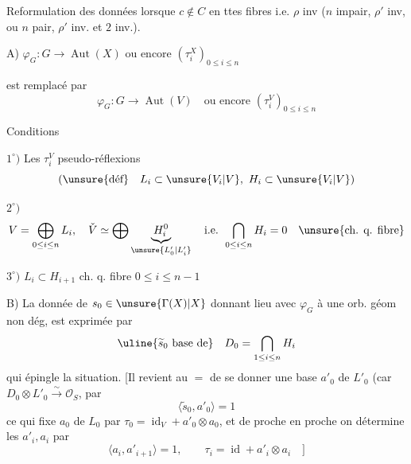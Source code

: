Reformulation des données lorsque $c\notin C$ en ttes fibres
i.e. $\rho$ inv ($n$ impair, $\rho'$ inv, ou $n$ pair, $\rho'$ inv. et $2$ inv.).

A) $\varphi_G:G\longrightarrow\operatorname{Aut}(X)$
ou encore $(\tau_i^X)_{0\leq i\leq n}$

est remplacé par
\[
\varphi_G:G\longrightarrow\operatorname{Aut}(V)
\quad\text{ou encore }(\tau_i^V)_{0\leq i\leq n}
\]

Conditions

$1^\circ)$ Les $\tau_i^V$ pseudo-réflexions
\[
(\text{\unsure{déf}} \quad L_i\subset\unsure{V_i|V},\ H_i\subset\unsure{V_i|V})
\]


$2^\circ)$
\[
V=\bigoplus_{0\leq i\leq n}L_i,\quad
\check V\simeq\bigoplus\underbrace{H_i^0}_{\unsure{L'_0|L'_i}}
\quad\text{i.e. }\bigcap_{0\leq i\leq n}H_i=0
\quad\text{\unsure{ch. q. fibre}}
\]

$3^\circ)$ $L_i\subset H_{i+1}$ ch. q. fibre
\hfill$0\leq i\leq n-1$


B) La donnée de $s_0\in\unsure{\Gamma(X)|X}$
\deleted{$\mathbin{-}$}
donnant lieu avec $\varphi_G$ à une orb. géom non dég,
est  exprimée par
\[
\uline{\widetilde s_0\text{ base de}}\quad
D_0=\bigcap_{1\leq i\leq n}H_i
\]
qui épingle la situation.
[Il revient au $=$ de se donner une base
$a'_0$ de $L'_0$ (car $D_0\otimes L'_0\xrightarrow{\sim}\mathcal O_S$, par
\[
\boxed{\langle\widetilde s_0,a'_0\rangle=1}
\]
ce qui fixe  $a_0$ de $L_0$ par
$\tau_0=\operatorname{id}_V+a'_0\otimes a_0$,
et de proche en proche on détermine les $a'_i,a_i$ par
\[
\langle a_i,a'_{i+1}\rangle=1,\qquad
\tau_i=\operatorname{id}+a'_i\otimes a_i
\quad]
\]

